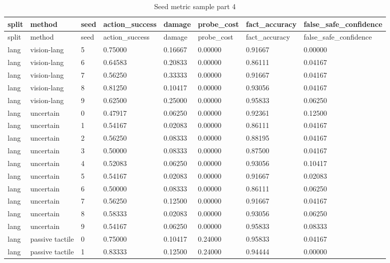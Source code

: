 \documentclass{article}
\begin{document}
\begin{center}
\tiny
\renewcommand{\arraystretch}{0.92}
\setlength{\tabcolsep}{3pt}
\begin{longtable}{llllllll}
\caption{Seed metric sample part 4}\label{tab:seed-metric-sample-4}\\
\toprule
split & method & seed & action\_success & damage & probe\_cost & fact\_accuracy & false\_safe\_confidence \\
\midrule
\endfirsthead
\toprule
split & method & seed & action\_success & damage & probe\_cost & fact\_accuracy & false\_safe\_confidence \\
\midrule
\endhead
lang & vision-lang & 5 & 0.75000 & 0.16667 & 0.00000 & 0.91667 & 0.00000 \\
lang & vision-lang & 6 & 0.64583 & 0.20833 & 0.00000 & 0.86111 & 0.04167 \\
lang & vision-lang & 7 & 0.56250 & 0.33333 & 0.00000 & 0.91667 & 0.04167 \\
lang & vision-lang & 8 & 0.81250 & 0.10417 & 0.00000 & 0.93056 & 0.04167 \\
lang & vision-lang & 9 & 0.62500 & 0.25000 & 0.00000 & 0.95833 & 0.06250 \\
lang & uncertain & 0 & 0.47917 & 0.06250 & 0.00000 & 0.92361 & 0.12500 \\
lang & uncertain & 1 & 0.54167 & 0.02083 & 0.00000 & 0.86111 & 0.04167 \\
lang & uncertain & 2 & 0.56250 & 0.08333 & 0.00000 & 0.88195 & 0.04167 \\
lang & uncertain & 3 & 0.50000 & 0.08333 & 0.00000 & 0.87500 & 0.04167 \\
lang & uncertain & 4 & 0.52083 & 0.06250 & 0.00000 & 0.93056 & 0.10417 \\
lang & uncertain & 5 & 0.54167 & 0.02083 & 0.00000 & 0.91667 & 0.02083 \\
lang & uncertain & 6 & 0.50000 & 0.08333 & 0.00000 & 0.86111 & 0.06250 \\
lang & uncertain & 7 & 0.56250 & 0.12500 & 0.00000 & 0.91667 & 0.04167 \\
lang & uncertain & 8 & 0.58333 & 0.02083 & 0.00000 & 0.93056 & 0.06250 \\
lang & uncertain & 9 & 0.54167 & 0.06250 & 0.00000 & 0.95833 & 0.08333 \\
lang & passive tactile & 0 & 0.75000 & 0.10417 & 0.24000 & 0.95833 & 0.04167 \\
lang & passive tactile & 1 & 0.83333 & 0.12500 & 0.24000 & 0.94444 & 0.00000 \\

\end{longtable}
\end{center}
\end{document}
